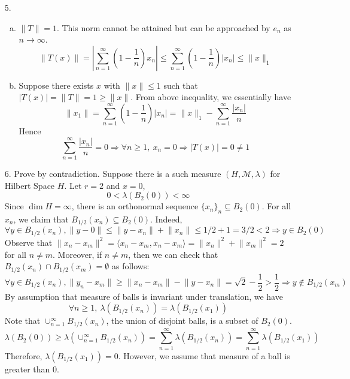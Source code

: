 \begin{itemize}
		\item[5.] \begin{enumerate}[(a)]
			\item $\lVert T\rVert  =1$. This norm cannot be attained but can be approached by $e_n$ as $n\rightarrow \infty$.
			$$
			\left\lVert T(x) \right\rVert = \left\lvert \sum_{n=1}^\infty \left(1-\frac{1}{n}\right)x_n  \right\rvert \le  \sum_{n=1}^\infty \left(1-\frac{1}{n}\right) \left\lvert  x_n  \right\rvert  \le \lVert x\rVert_1
			$$
			
			\item Suppose there exists $x$ with $\lVert x\rVert \le 1$ such that $|T(x)| = \lVert T\rVert = 1 \ge \lVert x\rVert$. From above inequality, we essentially have
			$$
			\lVert x_1\rVert = \sum_{n=1}^\infty \left(1-\frac{1}{n}\right) \left\lvert  x_n  \right\rvert = \lVert x\rVert_1 - \sum_{n=1}^\infty \frac{|x_n|}{n}
			$$
			Hence
			$$
			\sum_{n=1}^\infty \frac{|x_n|}{n} = 0 \Rightarrow  \forall n\ge 1,~ x_n=0 \Rightarrow |T(x)| = 0 \neq 1
			$$
		\end{enumerate}
		
		\item[6.] Prove by contradiction. Suppose there is a such measure $(H, \mathcal{M}, \lambda)$ for Hilbert Space $H$. Let $r=2$ and $x=0$, 
		$$
		0<\lambda\left(B_2(0)\right)<\infty
		$$
		Since $\dim H =\infty$, there is an orthonormal sequence $\{x_n\}_n\subseteq B_2(0)$. For all $x_n$, we claim that $B_{1/2}(x_n)\subseteq B_2(0)$. Indeed,
		$$
		\forall y\in B_{1/2}(x_n), \lVert y-0\rVert \le  \lVert y-x_n\rVert + \lVert x_n\rVert \le 1/2 + 1 = 3/2 < 2 \Rightarrow y\in B_2(0)
		$$
		Observe that $\lVert x_n - x_m \rVert ^2 = \langle x_n-x_m, x_n-x_m\rangle = \lVert x_n\rVert^2 + \lVert x_m\rVert^2 = 2$ for all $n\neq m$. Moreover, if $n\neq m$, then we can check that $B_{1/2}(x_n) \cap B_{1/2}(x_m) = \emptyset$ as follows:
		$$
		\forall y\in B_{1/2}(x_n), \lVert y_n - x_m \rVert \ge \lVert x_n -x_m \rVert - \lVert y-x_n\rVert = \sqrt{2} - \frac{1}{2}  > \frac{1}{2} \Rightarrow y\not \in B_{1/2}(x_m) 
		$$
		By assumption that measure of balls is invariant under translation, we have 
		$$\forall n\ge 1, ~\lambda(B_{1/2}(x_n)) = \lambda(B_{1/2}(x_1))$$
		Note that $\cup_{n=1}^\infty B_{1/2}(x_n)$, the union of disjoint balls, is a subset of $B_2(0)$. 
		$$
		\lambda(B_2(0)) \ge \lambda\left( \cup_{n=1}^\infty B_{1/2}(x_n)\right) =\sum_{n=1}^\infty \lambda(B_{1/2}(x_n)) = \sum_{n=1}^\infty \lambda(B_{1/2}(x_1))
		$$
		Therefore, $\lambda(B_{1/2}(x_1)) = 0$. However, we assume that measure of a ball is greater than 0.
		

\end{itemize}

